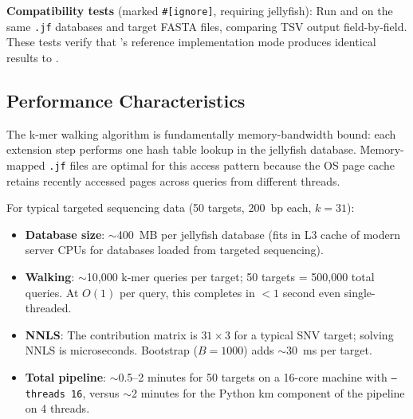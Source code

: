 \textbf{Compatibility tests} (marked \texttt{\#[ignore]}, requiring jellyfish):
Run \kmerdet{} and \km{} on the same \texttt{.jf} databases and target FASTA
files, comparing TSV output field-by-field.  These tests verify that
\kmerdet{}'s reference implementation mode produces identical results to \km{}.

\subsection{Performance Characteristics}
\label{sec:performance}

The k-mer walking algorithm is fundamentally memory-bandwidth bound: each
extension step performs one hash table lookup in the jellyfish database.
Memory-mapped \texttt{.jf} files are optimal for this access pattern because
the OS page cache retains recently accessed pages across queries from different
threads.

For typical targeted sequencing data (50 targets, 200~bp each, $k = 31$):

\begin{itemize}
  \item \textbf{Database size}: $\sim$400~MB per jellyfish database (fits in L3
    cache of modern server CPUs for databases loaded from targeted sequencing).
  \item \textbf{Walking}: $\sim$10{,}000 k-mer queries per target; 50 targets =
    500{,}000 total queries.  At $O(1)$ per query, this completes in $<1$ second
    even single-threaded.
  \item \textbf{NNLS}: The contribution matrix is $31 \times 3$ for a typical
    SNV target; solving NNLS is microseconds.  Bootstrap ($B = 1000$) adds
    $\sim$30~ms per target.
  \item \textbf{Total pipeline}: $\sim$0.5--2 minutes for 50 targets on a
    16-core machine with \texttt{--threads 16}, versus $\sim$2 minutes for the
    Python km component of the \kam{} pipeline on 4 threads.
\end{itemize}
